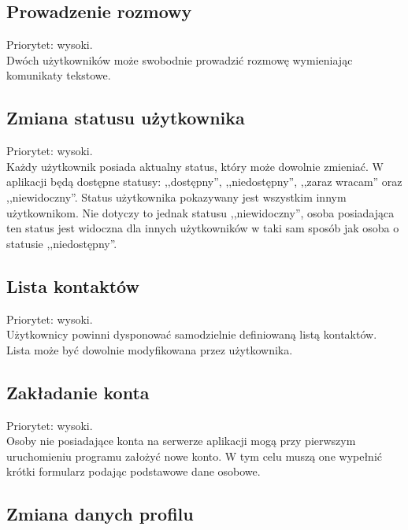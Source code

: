 \documentclass[a4paper,12pt]{article}
\begin{document}
\subsection[Prowadzenie rozmowy]{Prowadzenie rozmowy}

Priorytet: wysoki.\\

Dwóch użytkowników może swobodnie prowadzić rozmowę wymieniając komunikaty tekstowe.

\subsection[Zmiana statusu użytkownika]{Zmiana statusu użytkownika}

Priorytet: wysoki.\\

Każdy użytkownik posiada aktualny status, który może dowolnie zmieniać. W aplikacji będą dostępne statusy: ,,dostępny'', ,,niedostępny'', ,,zaraz wracam'' oraz ,,niewidoczny''. Status użytkownika pokazywany jest wszystkim innym użytkownikom. Nie dotyczy to jednak statusu ,,niewidoczny'', osoba posiadająca ten status jest widoczna dla innych użytkowników w taki sam sposób jak osoba o statusie ,,niedostępny''.

\subsection[Lista kontaktów]{Lista kontaktów}

Priorytet: wysoki.\\

Użytkownicy powinni dysponować samodzielnie definiowaną listą kontaktów. Lista może być dowolnie modyfikowana przez użytkownika.

\subsection[Zakładanie konta]{Zakładanie konta}

Priorytet: wysoki.\\

Osoby nie posiadające konta na serwerze aplikacji mogą przy pierwszym uruchomieniu programu założyć nowe konto. W tym celu muszą one wypełnić krótki formularz podając podstawowe dane osobowe.

\subsection[Zmiana danych profilu]{Zmiana danych profilu}
\end{document}
